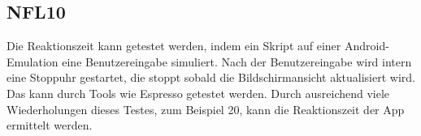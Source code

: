 \subsection*{NFL10}
Die Reaktionszeit kann getestet werden, indem ein Skript auf einer Android-Emulation eine Benutzereingabe simuliert.
Nach der Benutzereingabe wird intern eine Stoppuhr gestartet, die stoppt sobald die Bildschirmansicht aktualisiert wird.
Das kann durch Tools wie Espresso getestet werden.
Durch ausreichend viele Wiederholungen dieses Testes, zum Beispiel 20, kann die Reaktionszeit der App ermittelt werden.